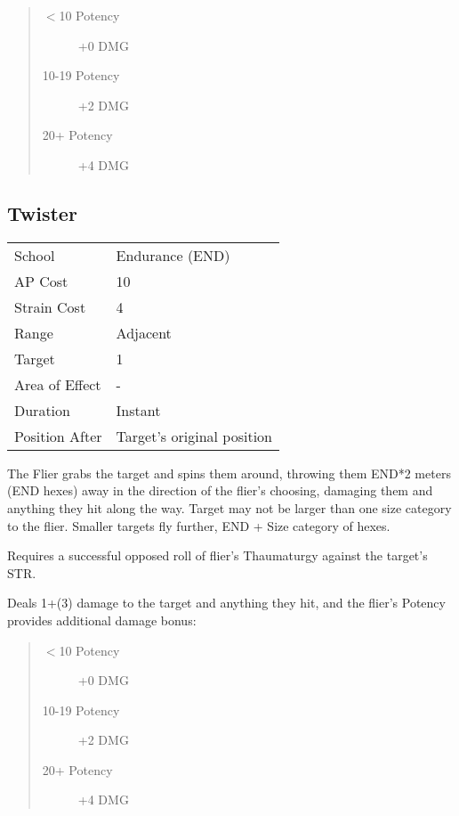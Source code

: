 \documentclass[11pt,a4paper,twocolumn]{book}
\begin{document}
\begin{quote}
	\begin{description}
		\item[$<$10 Potency] 	+0 DMG
		\item[10-19 Potency] 	+2 DMG
		\item[20+ Potency] 	+4 DMG
	\end{description}
\end{quote}








\subsection*{Twister}
{
	\begin{tabu} to 75mm{| X[l,4] | X[l,7] |}
		\hline
		School 			& Endurance (END) 	\\
		AP Cost	      	& 10 				\\
		Strain Cost     & 4 				\\
		Range     		& Adjacent 				\\
		Target      	& 1 				\\
		Area of Effect  & - 	 			\\
		Duration     	& Instant 	 		\\
		Position After  & Target's original position 		\\ \hline
	\end{tabu}
	
}

\medskip

The Flier grabs the target and spins them around, throwing them END*2 meters (END hexes) away in the direction of the flier's choosing, damaging them and anything they hit along the way. Target may not be larger than one size category to the flier. Smaller targets fly further, END + Size category of hexes.

Requires a successful opposed roll of flier's Thaumaturgy against the target's STR.

Deals 1+(3) damage to the target and anything they hit, and the flier's Potency provides additional damage bonus:

\begin{quote}
	\begin{description}
		\item[$<$10 Potency] 	+0 DMG
		\item[10-19 Potency] 	+2 DMG
		\item[20+ Potency] 	+4 DMG
	\end{description}
\end{quote}
\end{document}
